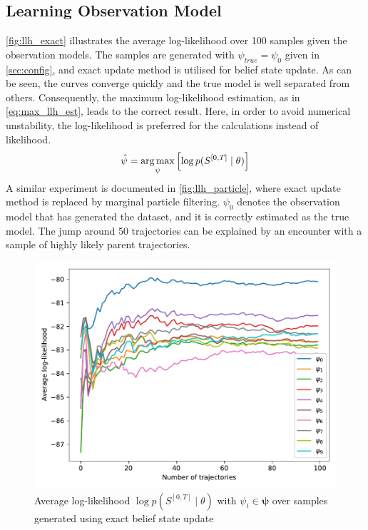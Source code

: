 \subsection{Learning Observation Model}
\autoref{fig:llh_exact} illustrates the average log-likelihood over 100 samples given the observation models. The samples are generated with $ \psi_{true} = \psi_0 $ given in \cref{sec:config}, and exact update method is utilised for belief state update. As can be seen, the curves converge quickly and the true model is well separated from others. Consequently, the maximum log-likelihood estimation, as in \autoref{eq:max_llh_est}, leads to the correct result. Here, in order to avoid numerical unstability, the log-likelihood is preferred for the calculations instead of likelihood.
\begin{equation}
\hat{\psi} = \operatorname*{arg\,max}_\psi \left[ \log p(S^{[0,T]} \mid \theta )\right] 
\label{eq:max_llh_est}
\end{equation}
A similar experiment is documented in \autoref{fig:llh_particle}, where exact update method is replaced by marginal particle filtering. $ \psi_0 $ denotes the observation model that has generated the dataset, and it is correctly estimated as the true model. The jump around 50 trajectories can be explained by an encounter with a sample of highly likely parent trajectories.
\begin{figure}[t]
	\begin{center}
		\includegraphics[width=.7\textwidth]{figures/roc_analysis/roc_exactUpdate/llh_exactUpdate_psi_0}
		\caption[Average log-likelihood in the case of exact belief update]{Average log-likelihood $ \log p(S^{[0,T]} \mid \theta) $ with $ \psi_i \in \boldsymbol{\psi} $ over samples generated using exact belief state update}
		\label{fig:llh_exact}
	\end{center}
\end{figure}
